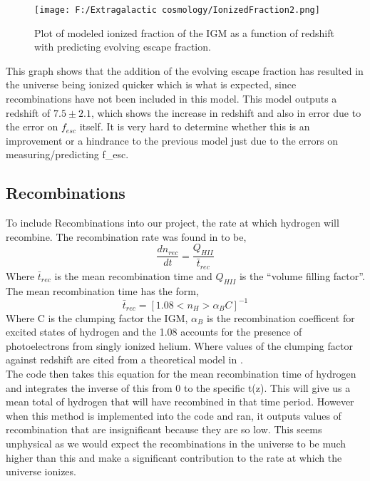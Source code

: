 \documentclass{article}
\begin{document}
\begin{figure}
	\centering
		\texttt{[image: F:/Extragalactic cosmology/IonizedFraction2.png]}
		\caption{Plot of modeled ionized fraction of the IGM as a function of redshift with predicting evolving escape fraction.} 
	\label{fig:IonizedFraction2}
\end{figure}

This graph shows that the addition of the evolving escape fraction has resulted in the universe being ionized quicker which is what is expected, since recombinations have not been included in this model. This model outputs a redshift of $7.5\pm2.1$, which shows the increase in redshift and also in error due to the error on $f_{esc}$ itself. It is very hard to determine whether this is an improvement or a hindrance to the previous model just due to the errors on measuring/predicting f_{esc}.\\

\subsection{Recombinations}
To include Recombinations into our project, the rate at which hydrogen will recombine. The recombination rate was found in \cite{2012ApJ...746..125H} to be, 
\begin{equation} 
\frac{dn_{rec}}{dt}=\frac{Q_{HII}}{\bar{t}_{rec}}
\end{equation}
Where $\bar{t}_{rec}$ is the mean recombination time and $Q_{HII}$ is the ``volume filling factor''. The mean recombination time has the form, 
\begin{equation} 
\bar{t}_{rec}= [1.08<n_{H}>\alpha_{B}C]^{-1}
\end{equation}
Where C is the clumping factor the IGM, $\alpha_{B}$ is the recombination coefficent for excited states of hydrogen and the 1.08 accounts for the presence of photoelectrons from singly ionized helium.  Where values of the clumping factor against redshift are cited from a theoretical model in \cite{2011MNRAS.412L..16R}.\\
The code then takes this equation for the mean recombination time of hydrogen and integrates the inverse of this from 0 to the specific t(z). This will give us a mean total of hydrogen that will have recombined in that time period. However when this method is implemented into the code and ran, it outputs values of recombination that are insignificant because they are so low. This seems unphysical as we would expect the recombinations in the universe to be much higher than this and make a significant contribution to the rate at which the universe ionizes.\\ 
\end{document}
